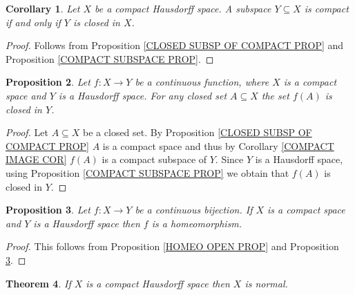 \documentclass[11pt, letterpaper, oneside]{report}
\theoremstyle{pplain}
\newtheorem{theorem}{Theorem}[chapter]
\newtheorem{proposition}[theorem]{Proposition}
\newtheorem{corollary}[theorem]{Corollary}
\newtheorem{ITERMVALUE THM}[theorem]{Intermediate Value Theorem}
\newtheorem{HEINEBOREL THM}[theorem]{Heine-Borel Theorem}
\newtheorem{UMETR THM}[theorem]{Urysohn Metrization Theorem}
\newtheorem{UMETR2 THM}[theorem]{Urysohn Metrization Theorem (v.2)}
\theoremstyle{ddefinition}
\theoremstyle{nnn}
\newtheorem{TDA NN}[theorem]{Topological Data Analysis. }
\theoremstyle{eexercise}
\begin{document}
\begin{corollary}
Let $X$ be a  compact Hausdorff space. A subspace  
$Y\subseteq X$ is compact if and only if   $Y$ is closed in $X$. 
\end{corollary}

\begin{proof}
Follows from Proposition \ref{CLOSED SUBSP OF COMPACT PROP} and 
Proposition \ref{COMPACT SUBSPACE PROP}.
\end{proof}

\begin{proposition}
\label{COMPACT TO HAUSDORFF CLOSED MAP PROP}
Let $f\colon X\to Y$ be a continuous function, where $X$ is a compact space and $Y$ is a Hausdorff space. 
For any closed set $A\subseteq X$ the set $f(A)$ is closed in $Y$.  
\end{proposition}


\begin{proof}
Let $A\subseteq X$ be a closed set. By Proposition \ref{CLOSED SUBSP OF COMPACT PROP}
$A$ is  a compact space and thus by Corollary  \ref{COMPACT IMAGE COR}  $f(A)$ is  a 
compact   subspace of $Y$. Since $Y$ is a Hausdorff space, 
using Proposition \ref{COMPACT SUBSPACE PROP} we obtain that $f(A)$ is closed in $Y$. 
\end{proof}


\begin{proposition}
\label{COMPACT TO HAUSDORF BIJ PROP}
Let $f\colon X\to Y$ be a continuous bijection. If $X$ is a compact space and $Y$ is a Hausdorff 
space then $f$ is a homeomorphism. 
\end{proposition}

\begin{proof}
This follows from  Proposition \ref{HOMEO OPEN PROP} and Proposition \ref{COMPACT TO HAUSDORF BIJ PROP}. 
\end{proof}


\begin{theorem}
\label{COMPACT IS NORMAL THM}
If $X$ is a  compact Hausdorff space then $X$ is normal.  
\end{theorem}
\end{document}
